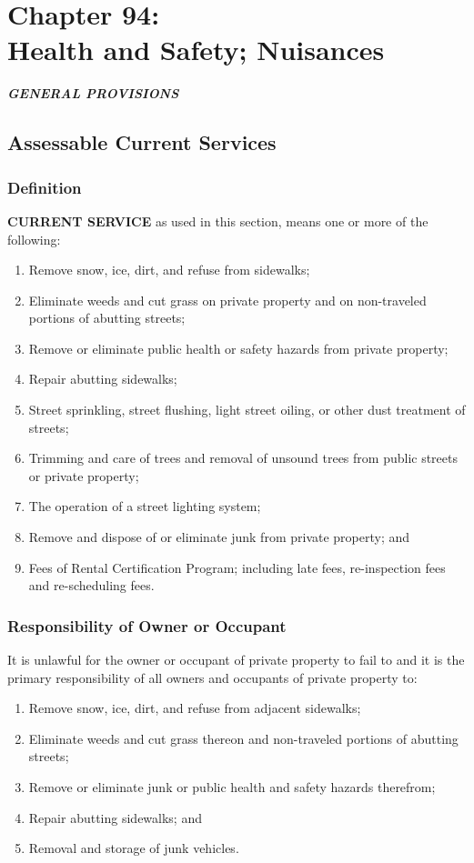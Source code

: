 \chapter*{Chapter 94: \\
	Health and Safety; Nuisances}
    \minitoc
    \pagebreak

\begin{center}
\emph{\textbf{\LARGE{GENERAL PROVISIONS}}}
\end{center}

\section{Assessable Current Services}
\subsection{Definition}
\textbf{CURRENT SERVICE} as used in this section, means one or more of the following: 
\begin{enumerate}[{\indent}1)]
    \item Remove snow, ice, dirt, and refuse from sidewalks; 
    \item Eliminate weeds and cut grass on private property and on non-traveled portions of abutting streets; 
    \item Remove or eliminate public health or safety hazards from private property; 
    \item Repair abutting sidewalks; 
    \item Street sprinkling, street flushing, light street oiling, or other dust treatment of streets; 
    \item Trimming and care of trees and removal of unsound trees from public streets or private property; 
    \item The operation of a street lighting system; 
    \item Remove and dispose of or eliminate junk from private property; and
    \item Fees of Rental Certification Program; including late fees, re-inspection fees and re-scheduling fees.
\end{enumerate}
\subsection{Responsibility of Owner or Occupant}
It is unlawful for the owner or occupant of private property to fail to and it is the primary responsibility of all owners and occupants of private property to: 
\begin{enumerate}[{\indent}1)]
    \item Remove snow, ice, dirt, and refuse from adjacent sidewalks; 
    \item Eliminate weeds and cut grass thereon and non-traveled portions of abutting streets; 
    \item Remove or eliminate junk or public health and safety hazards therefrom; 
    \item Repair abutting sidewalks; and
    \item Removal and storage of junk vehicles.
\end{enumerate}
